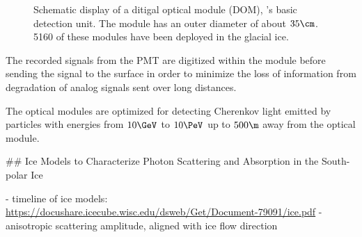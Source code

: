 \begin{figure}[htbp]
  \hfill
  \caption{Schematic display of a ditigal optical module (DOM), \icecube's basic detection unit. The module has an outer diameter of about $35\cm$. 5160 of these modules have been deployed in the glacial ice.}
  \label{fig:aK4raigh}
\end{figure}


The recorded signals from the PMT are digitized within the module before sending the signal to the surface in order to minimize the loss of information from degradation of analog signals sent over long distances. \cite{firstyearperformance}

The optical modules are optimized for detecting Cherenkov light emitted by particles with energies from $10\GeV$ to $10\PeV$ up to $500\m$ away from the optical module. \cite{instrumentation}


## Ice Models to Characterize Photon Scattering and Absorption in the South-polar Ice

- timeline of ice models: \url{https://docushare.icecube.wisc.edu/dsweb/Get/Document-79091/ice.pdf} \cite{flasherdataderivedicemodels}
- anisotropic scattering amplitude, aligned with ice flow direction \cite{icrc17pocam}

